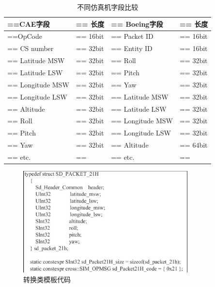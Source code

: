 \begin{table}[htbp]
    \begin{center}
        \caption{不同仿真机字段比较}
        \label{simsattr}
        \renewcommand\arraystretch{1.2}
        \begin{tabularx}{\textwidth}{ 
            | >{\centering\arraybackslash\hsize=\hsize\linewidth=\hsize}X 
            | >{\centering\arraybackslash\hsize=\hsize\linewidth=\hsize}X 
            | >{\centering\arraybackslash\hsize=\hsize\linewidth=\hsize}X 
            | >{\centering\arraybackslash\hsize=\hsize\linewidth=\hsize}X 
            | }
            \hline
            \textbf{CAE字段} & \textbf{长度} & \textbf{Boeing字段} & \textbf{长度}\\
            \hline
            OpCode & 16bit & Packet ID & 16bit\\
            \hline
            CS number & 32bit & Entity ID & 16bit\\
            \hline
            Latitude MSW & 32bit & Roll & 32bit\\
            \hline
            Latitude LSW & 32bit & Pitch & 32bit\\
            \hline
            Longitude MSW & 32bit & Yaw & 32bit\\
            \hline
            Longitude LSW & 32bit & Latitude MSW & 32bit\\
            \hline
            Altitude& 32bit & Latitude LSW & 32bit\\
            \hline
            Roll & 32bit & Longitude MSW & 32bit\\
            \hline
            Pitch& 32bit & Longitude LSW & 32bit\\
            \hline
            Yaw & 32bit & Altitude & 64bit\\
            \hline
            etc. & & etc. & \\
            \hline
        \end{tabularx}
    \end{center}
\end{table}
\begin{figure}[h!]
    \begin{center}
        \includegraphics[width=0.8\textwidth]{pictures/code12.pdf}
        \caption{转换类模板代码}
        \label{classtmp}
    \end{center}
\end{figure}

